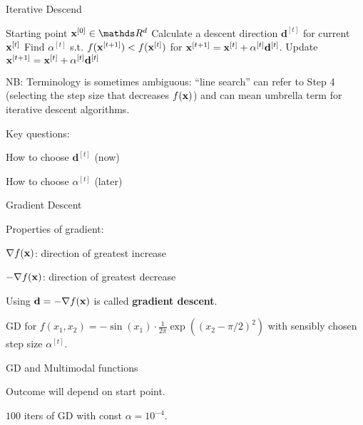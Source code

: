 \documentclass[11pt,compress,t,notes=noshow, xcolor=table]{beamer}
\begin{document}
\begin{frame2}{Iterative Descend}
\begin{algorithm}[H]
\caption{Iterative Descent / Line search}
\begin{algorithmic}[1]
\State Starting point $\xv^{[0]} \in \R^d$
\State Calculate a descent direction $\mathbf{d}^{[t]}$ for current $\mathbf{x}^{[t]}$
\State Find $\alpha^{[t]}$ s.t. $f(\mathbf{x}^{[t + 1]}) < f(\mathbf{x}^{[t]})$ for $\mathbf{x}^{[t + 1]} = \mathbf{x}^{[t]} + \alpha^{[t]} \mathbf{d}^{[t]}$.
\State Update $\mathbf{x}^{[t + 1]} = \mathbf{x}^{[t]} + \alpha^{[t]} \mathbf{d}^{[t]}$
\EndWhile
\end{algorithmic}
\end{algorithm}
\vspace*{-0.2cm}
\begin{tiny}
NB: Terminology is sometimes ambiguous: ``line search'' can refer to Step 4 (selecting the step size that decreases $f(\mathbf{x})$) and can mean umbrella term for iterative descent algorithms. \par
\end{tiny}\vfill
Key questions: 
\begin{itemizeM}
\item How to choose $\mathbf{d}^{[t]}$ (now)
\item How to choose $\alpha^{[t]}$ (later)
\end{itemizeM}
\end{frame2}

\begin{framei}{Gradient Descent}
\item Properties of gradient: 
\begin{itemizeS}
\item $\nabla f(\mathbf{x})$: direction of greatest increase
\item $- \nabla f(\mathbf{x})$: direction of greatest decrease
\end{itemizeS}
\vfill
\item Using $\mathbf{d} = - \nabla f(\mathbf{x})$ is called \textbf{gradient descent}. 
\begin{center}\begin{footnotesize}
GD for $f(x_1, x_2) = - \sin(x_1) \cdot \frac{1}{2\pi} \exp\left( (x_2 - \pi / 2)^2 \right)$ with sensibly chosen step size $\alpha^{[t]}$. 
\end{footnotesize}\end{center}
\end{framei}

\begin{framei}{GD and Multimodal functions}
\item[] Outcome will depend on start point.
\vfill
{}
{}
\begin{center}\begin{footnotesize}
$100$ iters of GD with const $\alpha = 10^{-4}$.
\end{footnotesize}\end{center}
\end{framei}
\end{document}
